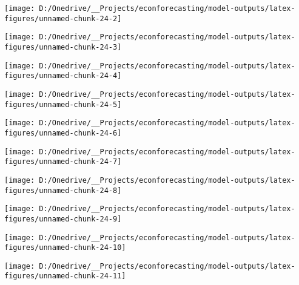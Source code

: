 \documentclass[11pt, letterpaper]{article}\usepackage[]{graphicx}\usepackage[]{color}
\begin{document}
{\centering \texttt{[image: D:/Onedrive/\_\_Projects/econforecasting/model-outputs/latex-figures/unnamed-chunk-24-2]} 

}




{\centering \texttt{[image: D:/Onedrive/\_\_Projects/econforecasting/model-outputs/latex-figures/unnamed-chunk-24-3]} 

}




{\centering \texttt{[image: D:/Onedrive/\_\_Projects/econforecasting/model-outputs/latex-figures/unnamed-chunk-24-4]} 

}




{\centering \texttt{[image: D:/Onedrive/\_\_Projects/econforecasting/model-outputs/latex-figures/unnamed-chunk-24-5]} 

}




{\centering \texttt{[image: D:/Onedrive/\_\_Projects/econforecasting/model-outputs/latex-figures/unnamed-chunk-24-6]} 

}




{\centering \texttt{[image: D:/Onedrive/\_\_Projects/econforecasting/model-outputs/latex-figures/unnamed-chunk-24-7]} 

}




{\centering \texttt{[image: D:/Onedrive/\_\_Projects/econforecasting/model-outputs/latex-figures/unnamed-chunk-24-8]} 

}




{\centering \texttt{[image: D:/Onedrive/\_\_Projects/econforecasting/model-outputs/latex-figures/unnamed-chunk-24-9]} 

}




{\centering \texttt{[image: D:/Onedrive/\_\_Projects/econforecasting/model-outputs/latex-figures/unnamed-chunk-24-10]} 

}




{\centering \texttt{[image: D:/Onedrive/\_\_Projects/econforecasting/model-outputs/latex-figures/unnamed-chunk-24-11]} 

}
\end{document}
